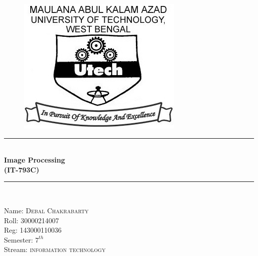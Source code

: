 \begin{titlepage}

\newcommand{\HRule}{\rule{\linewidth}{0.5mm}} %

\center %
 

\begin{figure}[h!]
	\centering
	\includegraphics[scale=1.4]{makaut.png}\\[1cm]
\end{figure}

\HRule \\[0.4cm]
{ \huge \bfseries Image Processing\\  (IT-793C)}\\[0.03cm] %
\HRule \\[1.5cm]

 


\vspace{0.4in}
\begin{flushleft}
	\Large {Name:}
    \textsc{Debal Chakrabarty}\\[0.3cm]
    \Large {Roll:} \textsc{30000214007} \\[0.3cm]
    \Large {Reg:} \textsc{143000110036} \\[0.3cm]
    \Large {Semester:} \textsc{$7^{th}$} \\[0.3cm]
    \Large {Stream:} \textsc{information technology} \\[0.2cm]
\end{flushleft}

\vfill %

\end{titlepage}

